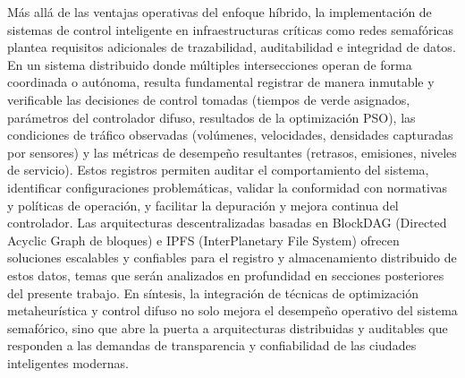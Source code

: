Más allá de las ventajas operativas del enfoque híbrido, la implementación de sistemas de control inteligente en infraestructuras críticas como redes semafóricas plantea requisitos adicionales de trazabilidad, auditabilidad e integridad de datos. En un sistema distribuido donde múltiples intersecciones operan de forma coordinada o autónoma, resulta fundamental registrar de manera inmutable y verificable las decisiones de control tomadas (tiempos de verde asignados, parámetros del controlador difuso, resultados de la optimización PSO), las condiciones de tráfico observadas (volúmenes, velocidades, densidades capturadas por sensores) y las métricas de desempeño resultantes (retrasos, emisiones, niveles de servicio). Estos registros permiten auditar el comportamiento del sistema, identificar configuraciones problemáticas, validar la conformidad con normativas y políticas de operación, y facilitar la depuración y mejora continua del controlador. Las arquitecturas descentralizadas basadas en BlockDAG (Directed Acyclic Graph de bloques) e IPFS (InterPlanetary File System) ofrecen soluciones escalables y confiables para el registro y almacenamiento distribuido de estos datos, temas que serán analizados en profundidad en secciones posteriores del presente trabajo. En síntesis, la integración de técnicas de optimización metaheurística y control difuso no solo mejora el desempeño operativo del sistema semafórico, sino que abre la puerta a arquitecturas distribuidas y auditables que responden a las demandas de transparencia y confiabilidad de las ciudades inteligentes modernas.

